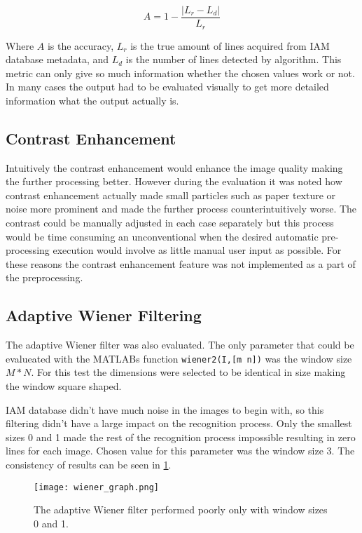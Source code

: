 \documentclass{article}
\def\code#1{\texttt{#1}}
\begin{document}
    \begin{equation}
      A = 1-\frac{|L_r-L_d|}{L_r}
    \end{equation}

    Where $A$ is the accuracy, $L_r$ is the true amount of lines acquired from IAM database metadata, and $L_d$ is the number of lines detected by algorithm. This metric can only give so much information whether the chosen values work or not. In many cases the output had to be evaluated visually to get more detailed information what the output actually is.


  \subsection{Contrast Enhancement}
    Intuitively the contrast enhancement would enhance the image quality making the further processing better. However during the evaluation it was noted how contrast enhancement actually made small particles such as paper texture or noise more prominent and made the further process counterintuitively worse. The contrast could be manually adjusted in each case separately but this process would be time consuming an unconventional when the desired automatic pre-processing execution would involve as little manual user input as possible. For these reasons the contrast enhancement feature was not implemented as a part of the preprocessing.

  \subsection{Adaptive Wiener Filtering}
    The adaptive Wiener filter was also evaluated. The only parameter that could be evalueated with the MATLABs function \code{wiener2(I,[m n])} was the window size $M * N$. For this test the dimensions were selected to be identical in size making the window square shaped.

    IAM database didn't have much noise in the images to begin with, so this filtering didn't have a large impact on the recognition process. Only the smallest sizes 0 and 1 made the rest of the recognition process impossible resulting in zero lines for each image. Chosen value for this parameter was the window size 3. The consistency of results can be seen in \ref{fig:wienertest}.

    \begin{figure}[!ht]
      \centering
      \texttt{[image: wiener\_graph.png]}
      \caption{The adaptive Wiener filter performed poorly only with window sizes 0 and 1.
      \label{fig:wienertest}}
    \end{figure}
\end{document}
